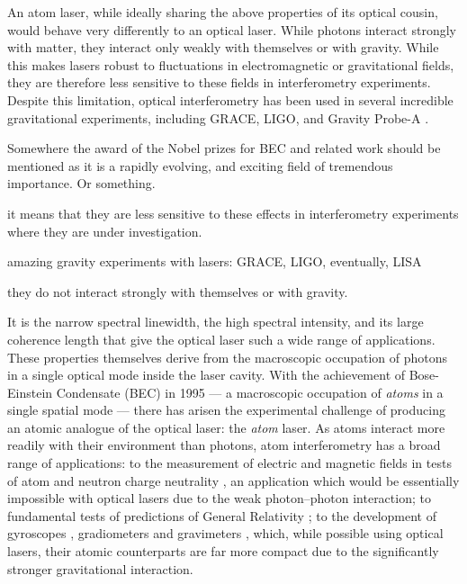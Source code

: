 An atom laser, while ideally sharing the above properties of its optical cousin, would behave very differently to an optical laser.  While photons interact strongly with matter, they interact only weakly with themselves or with gravity.  While this makes lasers robust to fluctuations in electromagnetic or gravitational fields, they are therefore less sensitive to these fields in interferometry experiments.  Despite this limitation, optical interferometry has been used in several incredible gravitational experiments, including GRACE, LIGO, and Gravity Probe-A \citep{Vessot:1980}.

Somewhere the award of the Nobel prizes for BEC and related work should be mentioned as it is a rapidly evolving, and exciting field of tremendous importance.  Or something.


it means that they are less sensitive to these effects in interferometry experiments where they are under investigation.  


amazing gravity experiments with lasers: GRACE, LIGO, eventually, LISA

they do not interact strongly with themselves or with gravity.  

It is the narrow spectral linewidth, the high spectral intensity, and its large coherence length that give the optical laser such a wide range of applications.  These properties themselves derive from the macroscopic occupation of photons in a single optical mode inside the laser cavity.  With the achievement of Bose-Einstein Condensate (BEC) in 1995 \citep{Anderson:1995vn,Bradley:1995ys,Davis:1995} --- a macroscopic occupation of \emph{atoms} in a single spatial mode --- there has arisen the experimental challenge of producing an atomic analogue of the optical laser: the \emph{atom} laser.  As atoms interact more readily with their environment than photons, atom interferometry has a broad range of applications: to the measurement of electric and magnetic fields in tests of atom and neutron charge neutrality \citep{Arvanitaki:2007}, an application which would be essentially impossible with optical lasers due to the weak photon--photon interaction; to fundamental tests of predictions of General Relativity \citep{Dimopoulos:2007uq}; to the development of gyroscopes \citep{Gustavson:1997}, gradiometers \citep{Snadden:1998,McGuirk:2002} and gravimeters \citep{Peters:2001}, which, while possible using optical lasers, their atomic counterparts are far more compact due to the significantly stronger gravitational interaction.


